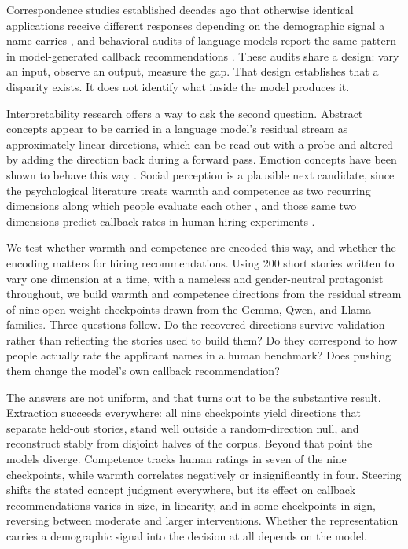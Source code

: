 \documentclass[twocolumn]{article}
\begin{document}
Correspondence studies established decades ago that otherwise identical
applications receive different responses depending on the demographic signal
a name carries
\citep{bertrand2004emily}, and behavioral audits of language models report
the same pattern in model-generated callback recommendations
\citep{an2024llm, an_measuring_2025, gaebler2024auditing}. These audits share
a design: vary an input, observe an output, measure the gap. That design
establishes that a disparity exists. It does not identify what inside the
model produces it.

Interpretability research offers a way to ask the second question. Abstract
concepts appear to be carried in a language model's residual stream as
approximately linear directions, which can be read out with a probe and
altered by adding the direction back during a forward pass. Emotion concepts
have been shown to behave this way \citep{sofroniew2026emotion}. Social
perception is a plausible next candidate, since the psychological literature
treats warmth and competence as two recurring dimensions along which people
evaluate each other \citep{fiske2002model}, and those same two dimensions
predict callback rates in human hiring experiments \citep{gallo2024warmth}.

We test whether warmth and competence are encoded this way, and whether the
encoding matters for hiring recommendations. Using 200 short stories written
to vary one dimension at a time, with a nameless and gender-neutral
protagonist throughout, we build warmth and competence directions from the
residual stream of nine open-weight checkpoints drawn from the Gemma, Qwen,
and Llama families. Three questions follow. Do the recovered directions
survive validation rather than reflecting the stories used to build them? Do
they correspond to how people actually rate the applicant names in a human
benchmark? Does pushing them change the model's own callback recommendation?

The answers are not uniform, and that turns out to be the substantive
result. Extraction succeeds everywhere: all nine checkpoints yield
directions that separate held-out stories, stand well outside a
random-direction null, and reconstruct stably from disjoint halves of the
corpus. Beyond that point the models diverge. Competence tracks human
ratings in seven of the nine checkpoints, while warmth correlates negatively
or insignificantly in four. Steering shifts the stated concept judgment
everywhere, but its effect on callback recommendations varies in
size, in linearity, and in some checkpoints in sign, reversing between
moderate and larger interventions. Whether the representation carries a
demographic signal into the decision at all depends on the model.
\end{document}
